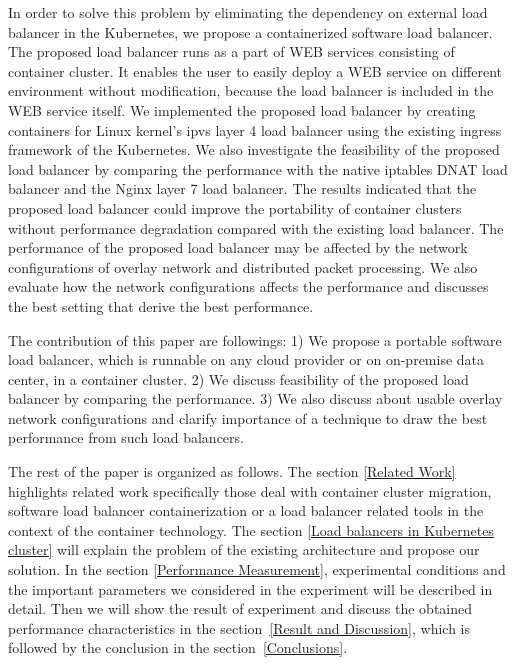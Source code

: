 In order to solve this problem by eliminating the dependency on external load balancer in the Kubernetes, 
we propose a containerized software load balancer. 
The proposed load balancer runs as a part of WEB services consisting of container cluster.
It enables the user to easily deploy a WEB service on different environment without modification, 
because the load balancer is included in the WEB service itself. 
We implemented the proposed load balancer by creating containers for Linux kernel's ipvs\cite{Zhang2000} 
layer 4 load balancer using the existing ingress\cite{K8sIngress2017} framework of the Kubernetes. 
We also investigate the feasibility of the proposed load balancer by comparing the performance 
with the native iptables DNAT load balancer and the Nginx layer 7 load balancer. 
The results indicated that the proposed load balancer could improve the portability of container clusters 
without performance degradation compared with the existing load balancer.
The performance of the proposed load balancer may be affected by the network configurations of overlay network 
and distributed packet processing. 
We also evaluate how the network configurations affects the performance and discusses 
the best setting that derive the best performance.

The contribution of this paper are followings: 
1) We propose a portable software load balancer, 
which is runnable on any cloud provider or on on-premise data center, 
in a container cluster.
2) We discuss feasibility of the proposed load balancer by comparing the performance.
3) We also discuss about usable overlay network configurations and clarify importance of a technique 
to draw the best performance from such load balancers.  

The rest of the paper is organized as follows.
The section \ref{Related Work} highlights related work specifically those deal with container cluster migration, 
software load balancer containerization or a load balancer related tools in the context of the container technology. 
The section \ref{Load balancers in Kubernetes cluster} will explain the problem of the existing architecture and propose our solution.
In the section \ref{Performance Measurement}, experimental conditions and the important parameters 
we considered in the experiment will be described in detail.
Then we will show the result of experiment and discuss the obtained performance characteristics in the section~\ref{Result and Discussion},  
which is followed by the conclusion in the section~\ref{Conclusions}.

